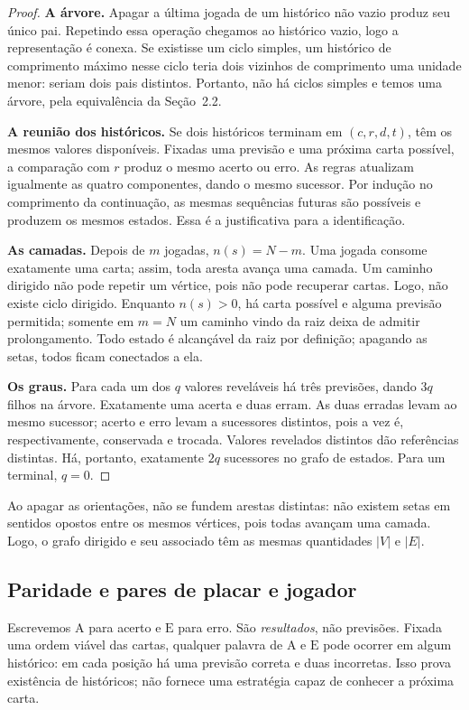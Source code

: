 \documentclass[11pt,a4paper]{article}
\theoremstyle{definition}
\newcommand{\A}{\mathrm{A}}
\newcommand{\Er}{\mathrm{E}}
\newcommand{\proxpagina}{\newpage}
\begin{document}
\begin{proof}
\textbf{A árvore.} Apagar a última jogada de um histórico não vazio produz seu único pai. Repetindo essa operação chegamos ao histórico vazio, logo a representação é conexa. Se existisse um ciclo simples, um histórico de comprimento máximo nesse ciclo teria dois vizinhos de comprimento uma unidade menor: seriam dois pais distintos. Portanto, não há ciclos simples e temos uma árvore, pela equivalência da Seção~2.2.

\textbf{A reunião dos históricos.} Se dois históricos terminam em $(c,r,d,t)$, têm os mesmos valores disponíveis. Fixadas uma previsão e uma próxima carta possível, a comparação com $r$ produz o mesmo acerto ou erro. As regras atualizam igualmente as quatro componentes, dando o mesmo sucessor. Por indução no comprimento da continuação, as mesmas sequências futuras são possíveis e produzem os mesmos estados. Essa é a justificativa para a identificação.

\textbf{As camadas.} Depois de $m$ jogadas, $n(s)=N-m$. Uma jogada consome exatamente uma carta; assim, toda aresta avança uma camada. Um caminho dirigido não pode repetir um vértice, pois não pode recuperar cartas. Logo, não existe ciclo dirigido. Enquanto $n(s)>0$, há carta possível e alguma previsão permitida; somente em $m=N$ um caminho vindo da raiz deixa de admitir prolongamento. Todo estado é alcançável da raiz por definição; apagando as setas, todos ficam conectados a ela.

\textbf{Os graus.} Para cada um dos $q$ valores reveláveis há três previsões, dando $3q$ filhos na árvore. Exatamente uma acerta e duas erram. As duas erradas levam ao mesmo sucessor; acerto e erro levam a sucessores distintos, pois a vez é, respectivamente, conservada e trocada. Valores revelados distintos dão referências distintas. Há, portanto, exatamente $2q$ sucessores no grafo de estados. Para um terminal, $q=0$.
\end{proof}

Ao apagar as orientações, não se fundem arestas distintas: não existem setas em sentidos opostos entre os mesmos vértices, pois todas avançam uma camada. Logo, o grafo dirigido e seu associado têm as mesmas quantidades $|V|$ e $|E|$.

\proxpagina
\subsection{Paridade e pares de placar e jogador}
Escrevemos $\A$ para acerto e $\Er$ para erro. São \emph{resultados}, não previsões. Fixada uma ordem viável das cartas, qualquer palavra de $\A$ e $\Er$ pode ocorrer em algum histórico: em cada posição há uma previsão correta e duas incorretas. Isso prova existência de históricos; não fornece uma estratégia capaz de conhecer a próxima carta.
\end{document}
